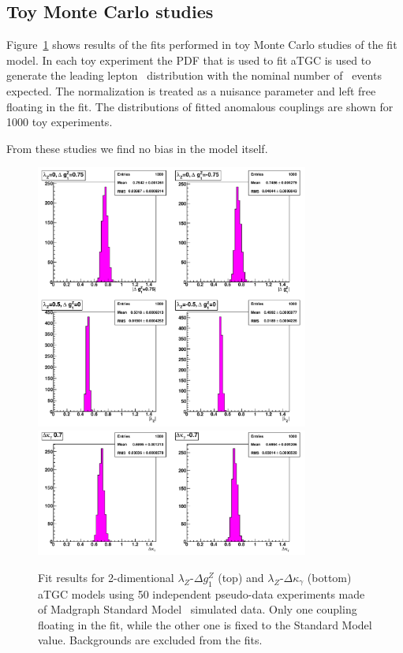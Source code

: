 \subsection{Toy Monte Carlo studies}
Figure~\ref{fig:toys} shows results of the fits
performed in toy Monte Carlo studies of the fit model. In each toy
experiment the PDF that is used to fit aTGC is used to generate the
leading lepton \pt\ distribution with the nominal number of \WW\
events expected. The normalization is treated as a nuisance parameter
and left free floating in the fit. The distributions of fitted
anomalous couplings are shown for 1000 toy experiments.

From these studies we find no bias in the model itself. 

\begin{figure}[tp]
  \centering
    \includegraphics[width=0.8\textwidth]{figures/fit_wwATGC_toymc_1D_abs}
    \includegraphics[width=0.8\textwidth]{figures/fit_wwATGC_toymc_1D_abs2}

  \caption[Toy Monte Carlo studies] {Fit results for
  2-dimentional $\lambda_{Z}$-$\Delta g^Z_1$ (top) and
  $\lambda_{Z}$-$\Delta\kappa_\gamma$ (bottom) aTGC models using 50
  independent pseudo-data experiments made of Madgraph Standard
  Model \ww\ simulated data. Only one coupling floating in the fit,
  while the other one is fixed to the Standard Model
  value. Backgrounds are excluded from the fits.}

\label{fig:toys}
\end{figure}

